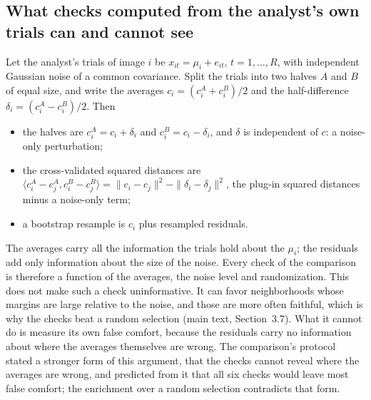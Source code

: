 \documentclass[11pt]{article}
\begin{document}
\subsection{What checks computed from the analyst's own trials can and cannot see}
Let the analyst's trials of image $i$ be $x_{it}=\mu_i+e_{it}$, $t=1,\dots,R$, with independent Gaussian noise of a common covariance.
Split the trials into two halves $A$ and $B$ of equal size, and write the averages $c_i=(c^A_i+c^B_i)/2$ and the half-difference $\delta_i=(c^A_i-c^B_i)/2$.
Then
\begin{itemize}[leftmargin=*]
  \item the halves are $c^A_i=c_i+\delta_i$ and $c^B_i=c_i-\delta_i$, and $\delta$ is independent of $c$: a noise-only perturbation;
  \item the cross-validated squared distances are $\langle c^A_i-c^A_j,c^B_i-c^B_j\rangle=\|c_i-c_j\|^2-\|\delta_i-\delta_j\|^2$, the plug-in squared distances minus a noise-only term;
  \item a bootstrap resample is $c_i$ plus resampled residuals.
\end{itemize}
The averages carry all the information the trials hold about the $\mu_i$; the residuals add only information about the size of the noise.
Every check of the comparison is therefore a function of the averages, the noise level and randomization.
This does not make such a check uninformative.
It can favor neighborhoods whose margins are large relative to the noise, and those are more often faithful, which is why the checks beat a random selection (main text, Section~3.7).
What it cannot do is measure its own false comfort, because the residuals carry no information about where the averages themselves are wrong.
The comparison's protocol stated a stronger form of this argument, that the checks cannot reveal where the averages are wrong, and predicted from it that all six checks would leave most false comfort; the enrichment over a random selection contradicts that form.
\end{document}
